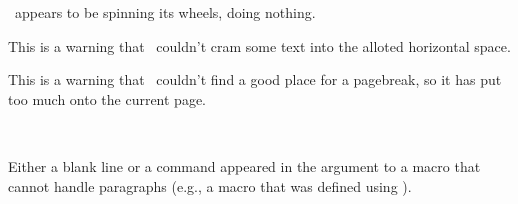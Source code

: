 \begin{plainlist}
       \tx\ appears to be spinning its wheels, doing nothing.


\item[\textmess{!}] 

    This is a warning that \tx\ couldn't cram some text into the alloted
horizontal space.

\item[\textmess{!}]

    This is a warning that \tx\ couldn't find a good place for a
pagebreak, so it has put too much onto the current page.


\item[\textmess{!}] 
     \\

      Either a blank line or a  command appeared in the
      argument to a macro that cannot handle paragraphs (e.g.,
      a macro that was defined using \cmd{\newcommand*}).



\item[\textmess{!}]  


\end{plainlist}
